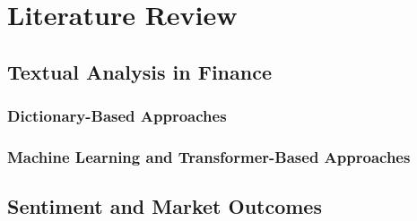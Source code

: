 \documentclass[12pt,a4paper,oneside]{report}
\begin{document}
\chapter{Literature Review}
\label{ch:literature}

\section{Textual Analysis in Finance}
\label{sec:textual_analysis}

\subsection{Dictionary-Based Approaches}
\label{sec:dictionary_approaches}

\subsection{Machine Learning and Transformer-Based Approaches}
\label{sec:ml_approaches}

\section{Sentiment and Market Outcomes}
\label{sec:sentiment_markets}
\end{document}
